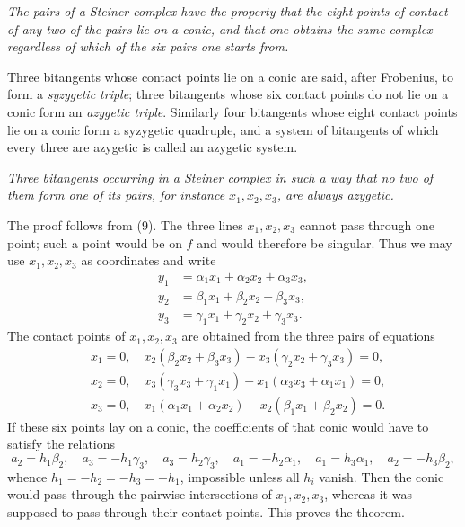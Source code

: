 \documentclass[11pt]{article}
\begin{document}
\emph{The pairs of a Steiner complex have the property that the eight points of contact of any two of the pairs lie on a conic, and that one obtains the same complex regardless of which of the six pairs one starts from.}

Three bitangents whose contact points lie on a conic are said, after Frobenius, to form a \emph{syzygetic triple}; three bitangents whose six contact points do not lie on a conic form an \emph{azygetic triple}. Similarly four bitangents whose eight contact points lie on a conic form a syzygetic quadruple, and a system of bitangents of which every three are azygetic is called an azygetic system.

\emph{Three bitangents occurring in a Steiner complex in such a way that no two of them form one of its pairs, for instance \(x_1,x_2,x_3\), are always azygetic.}

The proof follows from (9). The three lines \(x_1,x_2,x_3\) cannot pass through one point; such a point would be on \(f\) and would therefore be singular. Thus we may use \(x_1,x_2,x_3\) as coordinates and write
\begin{align*}
 y_1&=\alpha_1x_1+\alpha_2x_2+\alpha_3x_3,\\
 y_2&=\beta_1x_1+\beta_2x_2+\beta_3x_3,\\
 y_3&=\gamma_1x_1+\gamma_2x_2+\gamma_3x_3.
\end{align*}
The contact points of \(x_1,x_2,x_3\) are obtained from the three pairs of equations
\begin{align*}
&x_1=0,\quad x_2(\beta_2x_2+\beta_3x_3)-x_3(\gamma_2x_2+\gamma_3x_3)=0,\\
&x_2=0,\quad x_3(\gamma_3x_3+\gamma_1x_1)-x_1(\alpha_3x_3+\alpha_1x_1)=0,\\
&x_3=0,\quad x_1(\alpha_1x_1+\alpha_2x_2)-x_2(\beta_1x_1+\beta_2x_2)=0.
\end{align*}
If these six points lay on a conic, the coefficients of that conic would have to satisfy the relations
\begin{equation}
 a_2=h_1\beta_2,
\quad a_3=-h_1\gamma_3,
\quad a_3=h_2\gamma_3,
\quad a_1=-h_2\alpha_1,
\quad a_1=h_3\alpha_1,
\quad a_2=-h_3\beta_2,
 \tag{10}
\end{equation}
whence \(h_1=-h_2=-h_3=-h_1\), impossible unless all \(h_i\) vanish. Then the conic would pass through the pairwise intersections of \(x_1,x_2,x_3\), whereas it was supposed to pass through their contact points. This proves the theorem.
\end{document}
